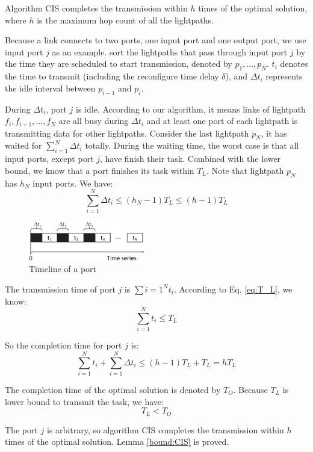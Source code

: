 \begin{theorem}\label{bound:CIS}
Algorithm CIS completes the transmission within $h$ times of the optimal solution, where $h$ is the maximum hop count of all the lightpaths.
\end{theorem}
\begin{IEEEproof}
Because a link connects to two ports, one input port and one output port, we use input port $j$ as an example. sort the lightpaths that pass through input port $j$ by the time they are scheduled to start transmission, denoted by $p_1,...,p_N$. $t_i$ denotes the time to transmit (including the reconfigure time delay $\delta$), and $\Delta t_i$ represents the idle interval between $p_{i-1}$ and $p_i$.

During $\Delta t_i$, port $j$ is idle. According to our algorithm, it means links of lightpath $f_i,f_{i+1},...,f_N$ are all busy during $\Delta t_i$ and at least one port of each lightpath is transmitting data for other lightpaths. Consider the last lightpath $p_N$, it has waited for $\sum\limits_{i=1}^{N}\Delta t_i$ totally. During the waiting time, the worst case is that all input ports, except port $j$, have finish their task. Combined with the lower bound, we know that a port finishes its task within $T_L$. Note that lightpath $p_N$ has $h_N$ input ports. We have:
\begin{equation}
\sum\limits_{i=1}^{N}\Delta t_i\leq (h_N-1)T_L\leq(h-1)T_L
\end{equation}


\begin{figure}
	\centering
    \includegraphics[width=0.45\textwidth]{timeline.eps}
	\caption{Timeline of a port}\label{fig:timeline}
\end{figure}

The transmission time of port $j$ is $\sum\limits{i=1}^N t_i$. According to Eq. \ref{eq:T_L}, we know:
\begin{equation}
\sum\limits_{i=1}^N t_i\leq T_L
 \end{equation}

So the completion time for port $j$ is:
\begin{equation}
\sum\limits_{i=1}^N t_i+\sum\limits_{i=1}^{N}\Delta t_i\leq (h-1)T_L+T_L=h T_L
\end{equation}

The completion time of the optimal solution is denoted by $T_O$. Because $T_L$ is lower bound to transmit the task, we have:
\begin{equation}
T_L<T_O
\end{equation}

The port $j$ is arbitrary, so algorithm CIS completes the transmission within $h$ times of the optimal solution. Lemma \ref{bound:CIS} is proved.

\end{IEEEproof}

